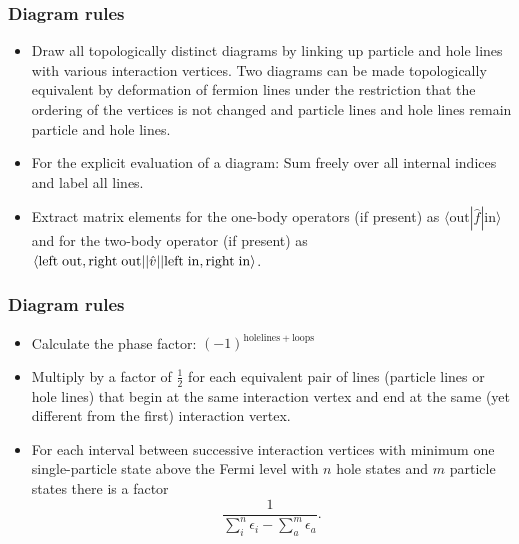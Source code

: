 \documentclass[compress]{beamer}
\newcommand*{\ket}[1]{|#1\rangle}
\newcommand*{\bra}[1]{\langle#1|}
\begin{document}
\frame
{
\frametitle{Diagram rules}
\begin{small}
{\scriptsize
    \begin{itemize}
        \item Draw all topologically distinct diagrams by linking up particle and hole lines with various interaction vertices. Two diagrams can be made topologically equivalent by deformation of fermion lines under the restriction that the ordering of the vertices is not changed and particle lines and hole lines remain particle and hole lines.
        \item For the explicit evaluation of a diagram: Sum freely over all internal indices and label all lines. 
        \item Extract matrix elements for the one-body operators (if present) as $\langle \mathrm{out} |\hat{f}| \mathrm{in}\rangle$ and for the two-body operator (if present) as  
            $\bra{\mathrm{left\hspace{0.1cm}out, right\hspace{0.1cm}out}}|\hat{v}|\ket{\mathrm{left\hspace{0.1cm}in, right\hspace{0.1cm}in}}$. 
    \end{itemize}

}
\end{small}
}

\frame
{
\frametitle{Diagram rules}
\begin{small}
{\scriptsize
    \begin{itemize}
        \item Calculate the phase factor: $(-1)^{\mathrm{holelines} + \mathrm{loops}}$ 
        \item Multiply by a factor of $\frac{1}{2}$ for each equivalent pair of lines (particle lines or hole lines) that begin at the same interaction vertex and end at the same (yet different from the first) interaction vertex. 
\item For each interval between successive interaction vertices with minimum one single-particle state above the Fermi level with $n$ hole states and $m$ particle states there is a factor
\[
\frac{1}{\sum_i^n\epsilon_i-\sum_a^m\epsilon_a}.
\]
\end{itemize}

}
\end{small}
}
\end{document}
